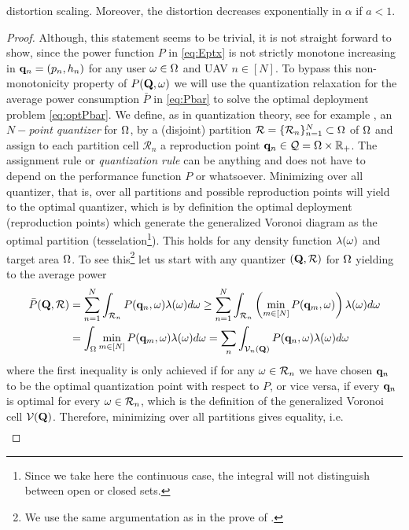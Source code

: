 \documentclass[smallabstract,smallcaptions]{dccpaper}
\newcounter{example}[section]
\newif\ifproof\prooffalse %
\newcommand{\Pbar}{\ensuremath{\bar{P}}}         %
\newcommand{\Vor}{\ensuremath{\mathcal{V}}}         %
\newcommand{\Rset}{\ensuremath{\mathcal R}}
\newcommand{\Qset}{\ensuremath{\mathcal Q}}
\begin{document}
distortion scaling. Moreover, the distortion decreases exponentially in $\alpha$ if $a<1$.
%
\ifproof
\begin{proof}
  Although, this statement seems to be trivial, it is not straight forward to show, since the power function $P$ in
  \eqref{eq:Eptx} is not strictly monotone increasing in ${\mathbf q}_n=(p_n,h_n)$ for any user $\omega \in\Omega$ and UAV
  $n\in[N]$. To bypass this non-monotonicity property of $P(\mathbf Q,\omega)$ we will use the quantization relaxation for the
  average power consumption $\Pbar$ in \eqref{eq:Pbar} to  solve the optimal deployment problem \eqref{eq:optPbar}. We
  define, as in quantization theory, see for example \cite{GN98}, an \emph{$N-$point quantizer} for $\Omega$, by a
  (disjoint) partition $\Rset=\{\Rset_n\}_{n=1}^N\subset \Ome$ of $\Omega$ and assign to each partition cell $\Rset_n$ a
  reproduction point $\vq_n\in\Qset=\Ome\times\R_+$. The assignment rule or \emph{quantization rule} can be anything and
  does not have to depend on the performance function $P$ or whatsoever.  Minimizing over all quantizer, that is, over
  all partitions and possible reproduction points will yield to the optimal quantizer, which is by definition the
  optimal deployment (reproduction points) which generate the generalized Voronoi diagram as the optimal partition
  (tesselation\footnote{Since we take here the continuous case, the integral will not distinguish between open or closed
  sets.}). This holds for any density function $\lambda(\omega)$ and target area $\Omega$.  To see this\footnote{We use the
    same argumentation as in the prove of \cite[Prop.1]{Erdem}.} let us start with any quantizer $(\vQ,\Rset)$ for $\Omega$
    yielding to the average power 
  \begin{align}
    \Pbar(\vQ,\Rset) &=\sum_{n=1}^N \int_{\Rset_n} P(\vq_n,\ome)\lam(\ome) d\ome \geq \sum_{n=1}^N \int_{\Rset_n} 
    \left(\min_{m\in[N]} P(\vq_m,\ome) \right) \lam(\ome)d\ome\\
    &=\int_{\Ome} \min_{m\in[N]} P(\vq_m,\ome) \lam(\ome)d\ome
    =\sum_n \int_{\Vor_n(\vQ)} P(\vq_n,\ome) \lam(\ome)d\ome\notag
  \end{align} 
  where the first inequality is only achieved if for any $\ome\in \Rset_n$ we have chosen ${\mathbf q}_n$ to be the optimal
  quantization point with respect to $P$, or vice versa, if every ${\mathbf q}_n$ is optimal for every $\ome\in \Rset_n$, which is the
  definition of the generalized Voronoi cell $\Vor(\vQ)$. Therefore, minimizing over all partitions gives equality, i.e.
  \begin{align}

\end{align}
\end{proof}
\end{document}
